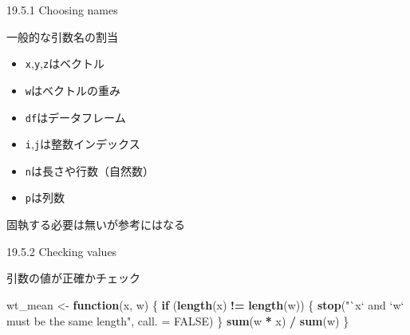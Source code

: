 \documentclass[ignorenonframetext,]{beamer}
\newenvironment{Shaded}{\begin{snugshade}}{\end{snugshade}}
\newcommand{\KeywordTok}[1]{\textcolor[rgb]{0.13,0.29,0.53}{\textbf{#1}}}
\newcommand{\DataTypeTok}[1]{\textcolor[rgb]{0.13,0.29,0.53}{#1}}
\newcommand{\StringTok}[1]{\textcolor[rgb]{0.31,0.60,0.02}{#1}}
\newcommand{\OtherTok}[1]{\textcolor[rgb]{0.56,0.35,0.01}{#1}}
\newcommand{\ControlFlowTok}[1]{\textcolor[rgb]{0.13,0.29,0.53}{\textbf{#1}}}
\newcommand{\OperatorTok}[1]{\textcolor[rgb]{0.81,0.36,0.00}{\textbf{#1}}}
\newcommand{\NormalTok}[1]{#1}
\providecommand{\tightlist}{%
  \setlength{\itemsep}{0pt}\setlength{\parskip}{0pt}}
\begin{document}
\begin{frame}[fragile]{19.5.1 Choosing names}

一般的な引数名の割当

\begin{itemize}
\tightlist
\item
  \texttt{x},\texttt{y},\texttt{z}はベクトル
\item
  \texttt{w}はベクトルの重み
\item
  \texttt{df}はデータフレーム
\item
  \texttt{i},\texttt{j}は整数インデックス
\item
  \texttt{n}は長さや行数（自然数）
\item
  \texttt{p}は列数
\end{itemize}

固執する必要は無いが参考にはなる

\end{frame}

\begin{frame}[fragile]{19.5.2 Checking values}

引数の値が正確かチェック

\begin{Shaded}
\begin{Highlighting}[]
\NormalTok{wt_mean <-}\StringTok{ }\ControlFlowTok{function}\NormalTok{(x, w) \{}
    \ControlFlowTok{if}\NormalTok{ (}\KeywordTok{length}\NormalTok{(x) }\OperatorTok{!=}\StringTok{ }\KeywordTok{length}\NormalTok{(w)) \{}
          \KeywordTok{stop}\NormalTok{(}\StringTok{"`x` and `w` must be the same length"}\NormalTok{, }\DataTypeTok{call. =} \OtherTok{FALSE}\NormalTok{)}
\NormalTok{  \}}
  \KeywordTok{sum}\NormalTok{(w }\OperatorTok{*}\StringTok{ }\NormalTok{x) }\OperatorTok{/}\StringTok{ }\KeywordTok{sum}\NormalTok{(w)}
\NormalTok{\}}
\end{Highlighting}
\end{Shaded}

\end{frame}
\end{document}
